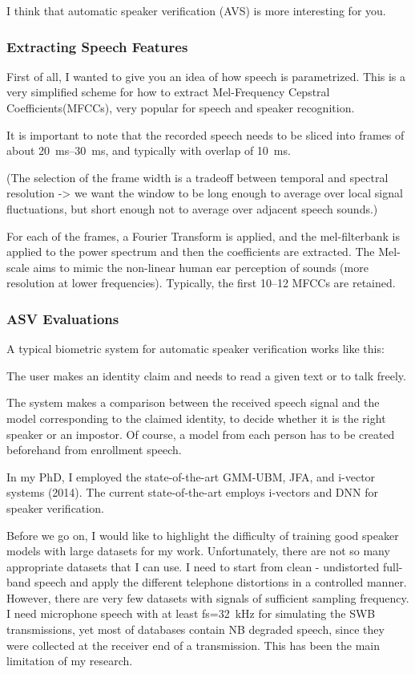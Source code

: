 \documentclass[a4paper]{article}
\begin{document}
I think that automatic speaker verification (AVS) is more interesting for you.

\subsubsection{Extracting Speech Features}

First of all, I wanted to give you an idea of how speech is parametrized. This is a very simplified scheme for how to extract Mel-Frequency Cepstral Coefficients(MFCCs), very popular for speech and speaker recognition.

It is important to note that the recorded speech needs to be sliced into frames of about 20~ms--30~ms, and typically with overlap of 10~ms. 

(The selection of the frame width is a tradeoff between temporal and spectral resolution -> we want the window to be long enough to average over local signal fluctuations, but short enough not to average over adjacent speech sounds.)

For each of the frames, a Fourier Transform is applied, and the mel-filterbank is applied to the power spectrum and then the coefficients are extracted. The Mel-scale aims to mimic the non-linear human ear perception of sounds (more resolution at lower frequencies). Typically, the first 10--12 MFCCs are retained.

\subsubsection{ASV Evaluations}

A typical biometric system for automatic speaker verification works like this:

The user makes an identity claim and needs to read a given text or to talk freely.

The system makes a comparison between the received speech signal and the model corresponding to the claimed identity, to decide whether it is the right speaker or an impostor. Of course, a model from each person has to be created beforehand from enrollment speech.

In my PhD, I employed the state-of-the-art GMM-UBM, JFA, and i-vector systems (2014). The current state-of-the-art employs i-vectors and DNN for speaker verification.

Before we go on, I would like to highlight the difficulty of training good speaker models with large datasets for my work. Unfortunately, there are not so many appropriate datasets that I can use. I need to start from clean - undistorted full-band speech and apply the different telephone distortions in a controlled manner. However, there are very few datasets with signals of sufficient sampling frequency. I need microphone speech with at least fs=32~kHz for simulating the SWB transmissions, yet most of databases contain NB degraded speech, since they were collected at the receiver end of a transmission. This has been the main limitation of my research.
\end{document}
